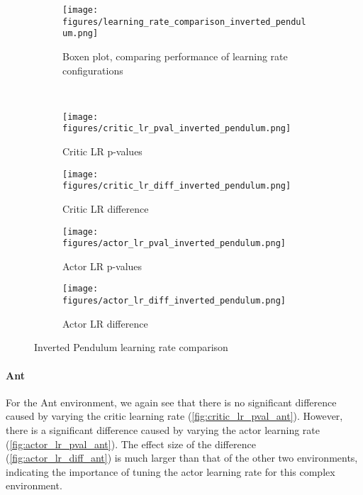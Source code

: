 \documentclass{article}
\begin{document}
\begin{figure}[h!]
    \centering
    \begin{subfigure}{0.4\textwidth}
        \centering
        \texttt{[image: figures/learning\_rate\_comparison\_inverted\_pendulum.png]}
        \captionsetup{justification=centering}
        \caption{Boxen plot, comparing performance of learning rate configurations}
        \label{fig:learning_rate_comparison_inverted_pendulum}
    \end{subfigure}
    \\
    \begin{subfigure}{0.24\textwidth}
        \centering
        \texttt{[image: figures/critic\_lr\_pval\_inverted\_pendulum.png]}
        \captionsetup{justification=centering}
        \caption{Critic LR p-values}
        \label{fig:critic_lr_pval_inverted_pendulum}
    \end{subfigure}
    \begin{subfigure}{0.24\textwidth}
        \centering
        \texttt{[image: figures/critic\_lr\_diff\_inverted\_pendulum.png]}
        \captionsetup{justification=centering}
        \caption{Critic LR difference}
        \label{fig:critic_lr_diff_inverted_pendulum}
    \end{subfigure}
    \begin{subfigure}{0.24\textwidth}
        \centering
        \texttt{[image: figures/actor\_lr\_pval\_inverted\_pendulum.png]}
        \captionsetup{justification=centering}
        \caption{Actor LR p-values}
        \label{fig:actor_lr_pval_inverted_pendulum}
    \end{subfigure}
    \begin{subfigure}{0.24\textwidth}
        \centering
        \texttt{[image: figures/actor\_lr\_diff\_inverted\_pendulum.png]}
        \captionsetup{justification=centering}
        \caption{Actor LR difference}
        \label{fig:actor_lr_diff_inverted_pendulum}
    \end{subfigure}
    \caption{Inverted Pendulum learning rate comparison}
    \label{fig:inverted_pendulum_analysis}
\end{figure}

\paragraph{Ant}
For the Ant environment, we again see that there is no significant difference caused by varying the critic learning rate (\autoref{fig:critic_lr_pval_ant}). However, there is a significant difference caused by varying the actor learning rate (\autoref{fig:actor_lr_pval_ant}). The effect size of the difference (\autoref{fig:actor_lr_diff_ant}) is much larger than that of the other two environments, indicating the importance of tuning the actor learning rate for this complex environment.
\end{document}
